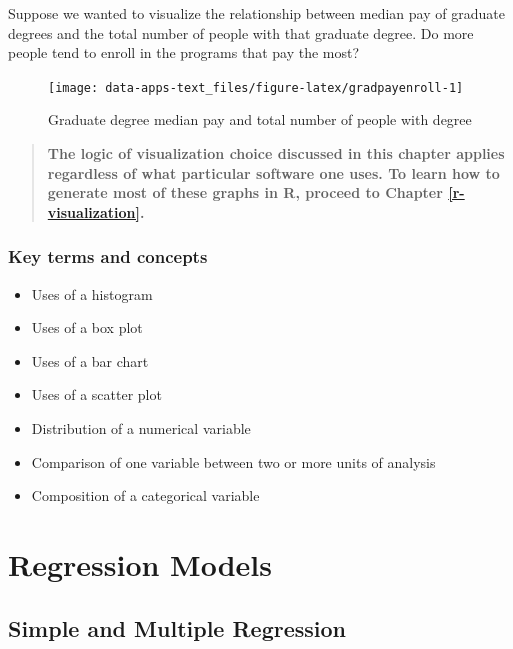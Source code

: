 \documentclass[
]{book}
\providecommand{\tightlist}{%
  \setlength{\itemsep}{0pt}\setlength{\parskip}{0pt}}
\begin{document}
Suppose we wanted to visualize the relationship between median pay of graduate degrees and the total number of people with that graduate degree. Do more people tend to enroll in the programs that pay the most?

\begin{figure}

{\centering \texttt{[image: data-apps-text\_files/figure-latex/gradpayenroll-1]} 

}

\caption{Graduate degree median pay and total number of people with degree}\label{fig:gradpayenroll}
\end{figure}

\begin{quote}
\textbf{The logic of visualization choice discussed in this chapter applies regardless of what particular software one uses. To learn how to generate most of these graphs in R, proceed to Chapter \ref{r-visualization}.}
\end{quote}

\hypertarget{kt5}{%
\section{Key terms and concepts}\label{kt5}}

\begin{itemize}
\tightlist
\item
  Uses of a histogram
\item
  Uses of a box plot
\item
  Uses of a bar chart
\item
  Uses of a scatter plot
\item
  Distribution of a numerical variable
\item
  Comparison of one variable between two or more units of analysis
\item
  Composition of a categorical variable
\end{itemize}

\hypertarget{part-regression-models}{%
\part{Regression Models}\label{part-regression-models}}

\hypertarget{simple-and-multiple-regression}{%
\chapter{Simple and Multiple Regression}\label{simple-and-multiple-regression}}
\end{document}
